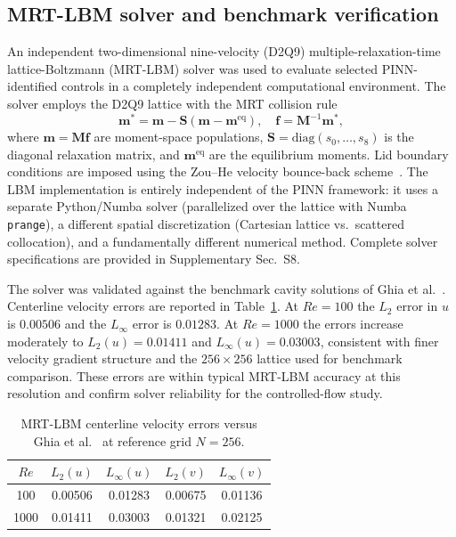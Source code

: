 \documentclass[a4paper,11pt]{article}
\begin{document}
\subsection{MRT-LBM solver and benchmark verification}

An independent two-dimensional nine-velocity (D2Q9) multiple-relaxation-time
lattice-Boltzmann (MRT-LBM) solver was used to evaluate selected PINN-identified
controls in a completely independent computational environment. The solver employs the D2Q9 lattice with the
MRT collision rule
\begin{equation}
\mathbf{m}^*=\mathbf{m}-\mathbf{S}(\mathbf{m}-\mathbf{m}^{\mathrm{eq}}),
\quad\mathbf{f}=\mathbf{M}^{-1}\mathbf{m}^*,
\end{equation}
where \(\mathbf{m}=\mathbf{M}\mathbf{f}\) are moment-space populations,
\(\mathbf{S}=\mathrm{diag}(s_0,\ldots,s_8)\) is the diagonal relaxation matrix,
and \(\mathbf{m}^{\mathrm{eq}}\) are the equilibrium moments. Lid boundary conditions
are imposed using the Zou--He velocity bounce-back scheme~\cite{pan2006high,chen1998lattice}.
The LBM implementation is entirely independent of the PINN framework: it uses a
separate Python/Numba solver (parallelized over the lattice with Numba
\texttt{prange}), a different spatial discretization (Cartesian lattice
vs.\ scattered collocation), and a fundamentally different numerical method.
Complete solver specifications are provided in Supplementary Sec.~S8.

The solver was validated against the benchmark cavity solutions of Ghia et al.\
\cite{ghia1982high}. Centerline velocity errors are reported in
Table~\ref{tab:ghia_verification}. At \(Re=100\) the \(L_2\) error in
\(u\) is \(0.00506\) and the \(L_\infty\) error is \(0.01283\). At \(Re=1000\)
the errors increase moderately to \(L_2(u)=0.01411\) and \(L_\infty(u)=0.03003\),
consistent with finer velocity gradient structure and the \(256\times256\) lattice
used for benchmark comparison. These errors are within typical MRT-LBM accuracy
at this resolution and confirm solver reliability for the controlled-flow study.

\begin{table}[t]
\centering
\caption{MRT-LBM centerline velocity errors versus Ghia et al.\
\protect\cite{ghia1982high} at reference grid \(N=256\).}
\label{tab:ghia_verification}
\small
\begin{tabular}{ccccc}
\toprule
\(Re\) & \(L_2(u)\) & \(L_\infty(u)\) & \(L_2(v)\) & \(L_\infty(v)\)\\
\midrule
100  & 0.00506 & 0.01283 & 0.00675 & 0.01136\\
1000 & 0.01411 & 0.03003 & 0.01321 & 0.02125\\
\bottomrule
\end{tabular}
\end{table}
\end{document}
